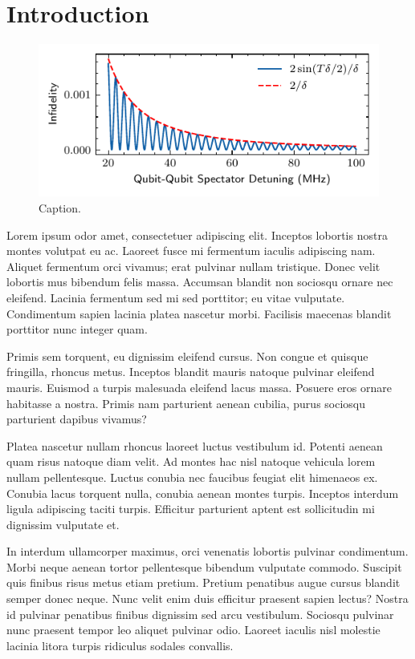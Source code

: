 
\section{Introduction}

\begin{figure}[t]
    \centering
    \includegraphics[width=0.95\columnwidth]{figures/fidelity_vs_detuning_up.pdf}
    \caption{Caption.}
    \label{fig:enter-label}
\end{figure}

Lorem ipsum odor amet, consectetuer adipiscing elit. Inceptos lobortis nostra montes volutpat eu ac. Laoreet fusce mi fermentum iaculis adipiscing nam. Aliquet fermentum orci vivamus; erat pulvinar nullam tristique. Donec velit lobortis mus bibendum felis massa. Accumsan blandit non sociosqu ornare nec eleifend. Lacinia fermentum sed mi sed porttitor; eu vitae vulputate. Condimentum sapien lacinia platea nascetur morbi. Facilisis maecenas blandit porttitor nunc integer quam.

Primis sem torquent, eu dignissim eleifend cursus. Non congue et quisque fringilla, rhoncus metus. Inceptos blandit mauris natoque pulvinar eleifend mauris. Euismod a turpis malesuada eleifend lacus massa. Posuere eros ornare habitasse a nostra. Primis nam parturient aenean cubilia, purus sociosqu parturient dapibus vivamus?

Platea nascetur nullam rhoncus laoreet luctus vestibulum id. Potenti aenean quam risus natoque diam velit. Ad montes hac nisl natoque vehicula lorem nullam pellentesque. Luctus conubia nec faucibus feugiat elit himenaeos ex. Conubia lacus torquent nulla, conubia aenean montes turpis. Inceptos interdum ligula adipiscing taciti turpis. Efficitur parturient aptent est sollicitudin mi dignissim vulputate et.

In interdum ullamcorper maximus, orci venenatis lobortis pulvinar condimentum. Morbi neque aenean tortor pellentesque bibendum vulputate commodo. Suscipit quis finibus risus metus etiam pretium. Pretium penatibus augue cursus blandit semper donec neque. Nunc velit enim duis efficitur praesent sapien lectus? Nostra id pulvinar penatibus finibus dignissim sed arcu vestibulum. Sociosqu pulvinar nunc praesent tempor leo aliquet pulvinar odio. Laoreet iaculis nisl molestie lacinia litora turpis ridiculus sodales convallis.

